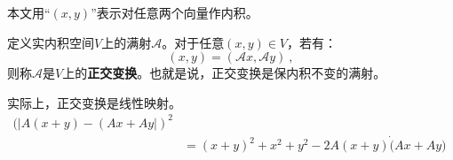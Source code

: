 
本文用“$(x,y)$”表示对任意两个向量作内积。
\begin{definition}{}
定义实内积空间$V$上的满射$\mathcal A$。对于任意$(x,y)\in V$，若有：
\begin{equation}
(x,y)=(\mathcal A x,\mathcal A y)~,
\end{equation}
则称$\mathcal A$是$V$上的\textbf{正交变换}。也就是说，正交变换是保内积不变的满射。
\end{definition}
实际上，正交变换是线性映射。
\begin{equation}
\begin{aligned}
(|A(x+y)-(Ax+Ay|)^2\\
&=(x+y)^2+x^2+y^2-2A(x+y)\dot (Ax+Ay)
\end{aligned}~
\end{equation}

